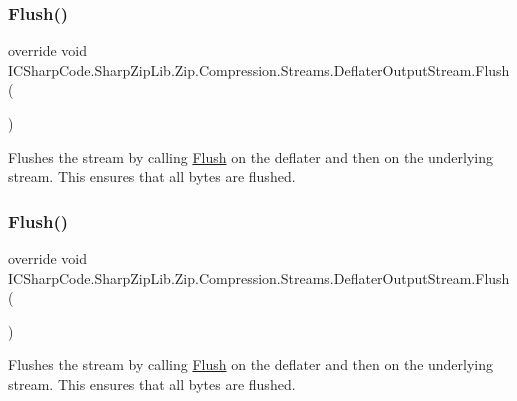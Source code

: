 \subsubsection{\texorpdfstring{Flush()}{Flush()}\hspace{0.1cm}{\footnotesize\ttfamily [1/2]}}
{\footnotesize\ttfamily override void I\+C\+Sharp\+Code.\+Sharp\+Zip\+Lib.\+Zip.\+Compression.\+Streams.\+Deflater\+Output\+Stream.\+Flush (\begin{DoxyParamCaption}{ }\end{DoxyParamCaption})\hspace{0.3cm}{\ttfamily [inline]}}



Flushes the stream by calling \hyperlink{class_i_c_sharp_code_1_1_sharp_zip_lib_1_1_zip_1_1_compression_1_1_streams_1_1_deflater_output_stream_a11795f61f58c5ee2d9fb8a33d8ea0d7e}{Flush} on the deflater and then on the underlying stream. This ensures that all bytes are flushed. 

\mbox{\label{class_i_c_sharp_code_1_1_sharp_zip_lib_1_1_zip_1_1_compression_1_1_streams_1_1_deflater_output_stream_a11795f61f58c5ee2d9fb8a33d8ea0d7e}} 
\subsubsection{\texorpdfstring{Flush()}{Flush()}\hspace{0.1cm}{\footnotesize\ttfamily [2/2]}}
{\footnotesize\ttfamily override void I\+C\+Sharp\+Code.\+Sharp\+Zip\+Lib.\+Zip.\+Compression.\+Streams.\+Deflater\+Output\+Stream.\+Flush (\begin{DoxyParamCaption}{ }\end{DoxyParamCaption})\hspace{0.3cm}{\ttfamily [inline]}}



Flushes the stream by calling \hyperlink{class_i_c_sharp_code_1_1_sharp_zip_lib_1_1_zip_1_1_compression_1_1_streams_1_1_deflater_output_stream_a11795f61f58c5ee2d9fb8a33d8ea0d7e}{Flush} on the deflater and then on the underlying stream. This ensures that all bytes are flushed. 

